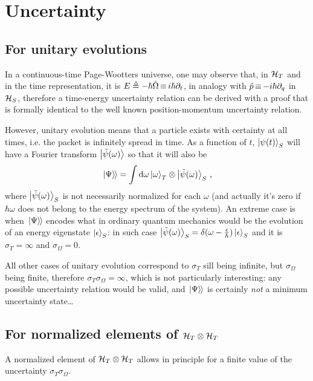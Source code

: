 \section{Uncertainty}

\subsection*{For unitary evolutions}

In a continuous-time Page-Wootters universe,
one may observe that,
in $\mathcal{H}_T$ and in the time representation,
it is $E \triangleq -\hbar\hat{\Omega} \operatorname*{\equiv} i\hbar\partial_{t}$,
in analogy with $\hat{p} \operatorname*{\equiv} -i\hbar\partial_{q}$ in $\mathcal{H}_S$,
therefore a time-energy uncertainty relation can be derived
with a proof that is formally identical to the well known
position-momentum uncertainty relation.

However, unitary evolution means that a particle exists with
certainty at all times, i.e. the packet
is infinitely spread in time.
%
As a function of $t$, $\ket{\psi(t)}_S$ will have a Fourier transform
$\ket{\tilde{\psi}(\omega)}$
so that it will also be
\[
  \left.\left| \Psi \right\rangle\hspace{-0.115em}\right\rangle = \int \dd \omega \ket{\omega}_T \otimes \ket{\tilde{\psi}(\omega)}_S \, \text{,}
\]
where $\ket{\tilde{\psi}(\omega)}_S$ is not necessarily normalized for each $\omega$
(and actually it's zero if $\hbar\omega$ does not belong to the energy spectrum of the system).
An extreme case is when $\left.\left| \Psi \right\rangle\hspace{-0.115em}\right\rangle$ encodes what in ordinary quantum mechanics would be the evolution
of an energy eigenstate $\ket{\epsilon}_S$: in such case
$\ket{\tilde{\psi}(\omega)}_S = \delta(\omega - \frac{\epsilon}{\hbar})\ket{\epsilon}_S$
and it is $\sigma_{T} = \infty$ and $\sigma_{\Omega} = 0$.

All other cases of unitary evolution correspond to $\sigma_{T}$
sill being infinite, but $\sigma_{\Omega}$ being finite, therefore
$\sigma_{T}\sigma_{\Omega} = \infty$, which is not particularly interesting:
any possible uncertainty relation would be valid, and $\left.\left| \Psi \right\rangle\hspace{-0.115em}\right\rangle$
is certainly \emph{not} a minimum uncertainty state\dots 

\subsection*{For normalized elements of $\mathcal{H}_T \otimes \mathcal{H}_T$}

A normalized element of $\mathcal{H}_T \otimes \mathcal{H}_T$ allows in principle for a finite value
of the uncertainty $\sigma_{T}\sigma_{\Omega}$.

